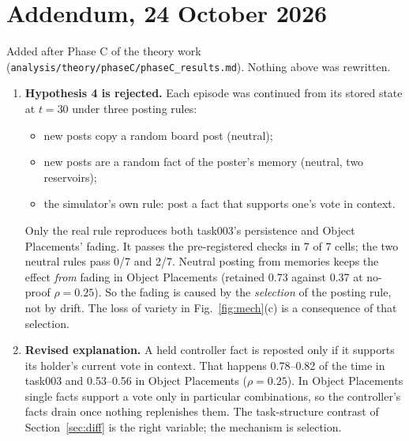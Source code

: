 \documentclass[10pt,a4paper]{article}
\begin{document}
\section*{Addendum, 24 October 2026}
Added after Phase C of the theory work (\nolinkurl{analysis/theory/phaseC/phaseC_results.md}). Nothing above was
rewritten.
\begin{enumerate}
\item \textbf{Hypothesis 4 is rejected.} Each episode was continued from its stored state at $t=30$ under three posting
  rules:
  \begin{itemize}
  \item new posts copy a random board post (neutral);
  \item new posts are a random fact of the poster's memory (neutral, two reservoirs);
  \item the simulator's own rule: post a fact that supports one's vote in context.
  \end{itemize}
  Only the real rule reproduces both task003's persistence and Object Placements' fading. It passes the pre-registered
  checks in 7 of 7 cells; the two neutral rules pass 0/7 and 2/7. Neutral posting from memories keeps the effect
  \emph{from} fading in Object Placements (retained 0.73 against 0.37 at no-proof $\rho=0.25$). So the fading is caused
  by the \emph{selection} of the posting rule, not by drift. The loss of variety in Fig.~\ref{fig:mech}(c) is a
  consequence of that selection.
\item \textbf{Revised explanation.} A held controller fact is reposted only if it supports its holder's current vote in
  context. That happens 0.78--0.82 of the time in task003 and 0.53--0.56 in Object Placements ($\rho=0.25$). In Object
  Placements single facts support a vote only in particular combinations, so the controller's facts drain once nothing
  replenishes them. The task-structure contrast of Section~\ref{sec:diff} is the right variable; the mechanism is
  selection.
\end{enumerate}
\end{document}
